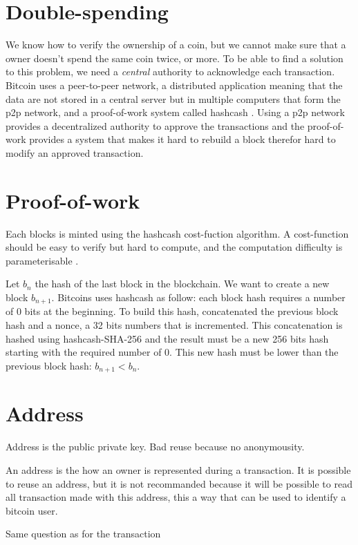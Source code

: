 \documentclass[letterpaper]{article}
\begin{document}
\section*{Double-spending}

We know how to verify the ownership of a coin, but we cannot make sure
that a owner doesn't spend the same coin twice, or more.
To be able to find a solution to this problem, we need a \textit{central}
authority to acknowledge each transaction. Bitcoin uses a peer-to-peer network,
a distributed application meaning that the data are not stored in a
central server but in multiple computers that form the p2p network,
and a proof-of-work system called hashcash \cite{hashcash}. Using a p2p network
provides a decentralized authority to approve the transactions and the proof-of-work
provides a system that makes it hard to rebuild a block therefor hard to modify
an approved transaction.

\section*{Proof-of-work}

Each blocks is minted using the hashcash cost-fuction algorithm.
A cost-function should be easy to verify but hard to compute, and the
computation difficulty is parameterisable \cite{hashcash}.

Let $b_n$ the hash
of the last block in the blockchain.
We want to create a new block $b_{n+1}$. Bitcoins uses hashcash as follow:
each block hash requires a number of 0 bits at the beginning. To build this
hash, concatenated the previous block hash and a nonce, a 32 bits numbers
that is incremented. This concatenation is hashed using hashcash-SHA-256
and the result
must be a new 256 bits hash starting with the required number of 0. This new
hash must be lower than the previous block hash: $b_{n+1} < b_n$.

\section{Address}

Address is the public private key. Bad reuse because no anonymousity.

An address is the how an owner is represented during a transaction.
It is possible to reuse an address, but it is not recommanded because
it will be possible to read all transaction made with this address, this
a way that can be used to identify a bitcoin user.

Same question as for the transaction
\end{document}
